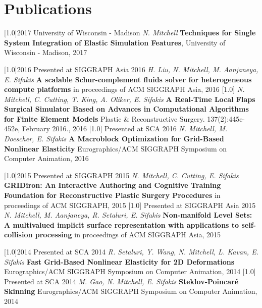 \documentclass{cv-style}     %
\begin{document}
\section{Publications}
  \vspace{-0.2cm}
\begin{entrylist}
\entry
{\scalebox{.8}[1.0]{2017}}
{}
{University of Wisconsin - Madison}
{\textit{N. Mitchell} \textbf{Techniques for
    Single System Integration of Elastic
    Simulation Features}, University of Wisconsin
  - Madison, 2017}
\end{entrylist}
\begin{entrylist}
\entry
{\scalebox{.8}[1.0]{2016}}
{}
{Presented at SIGGRAPH Asia 2016}
{\textit{H. Liu, N. Mitchell, M. Aanjaneya, E. Sifakis} \textbf{A
scalable Schur-complement fluids solver for
heterogeneous compute platforms}  in proceedings of
ACM SIGGRAPH Asia, 2016}
\entry
{\scalebox{.8}[1.0]{}}
{}
{}
{\textit{N. Mitchell, C. Cutting, T. King, A. Oliker,
E. Sifakis}  \textbf{A Real-Time Local Flaps Surgical
Simulator Based on Advances in Computational
Algorithms for Finite Element Models}  Plastic \&
Reconstructive Surgery. 137(2):445e-452e, February
2016., 2016}
\entry
{\scalebox{.8}[1.0]{}}
{}
{Presented at SCA 2016}
{\textit{N. Mitchell, M. Doescher, E. Sifakis}  \textbf{A Macroblock
Optimization for Grid-Based Nonlinear Elasticity}
Eurographics/ACM SIGGRAPH Symposium on Computer
Animation, 2016}
\end{entrylist}
\begin{entrylist}
\entry
{\scalebox{.8}[1.0]{2015}}
{}
{Presented at SIGGRAPH 2015}
{\textit{N. Mitchell, C. Cutting, E. Sifakis}  \textbf{GRIDiron: An
Interactive Authoring and Cognitive Training
Foundation for Reconstructive Plastic Surgery
Procedures}  in proceedings of ACM SIGGRAPH, 2015}
\entry
{\scalebox{.8}[1.0]{}}
{}
{Presented at SIGGRAPH Asia 2015}
{\textit{N. Mitchell, M. Aanjaneya, R. Setaluri, E. Sifakis}
\textbf{Non-manifold Level Sets: A multivalued implicit
surface representation with applications to
self-collision processing}  in proceedings of ACM
SIGGRAPH Asia, 2015}
\end{entrylist}
\begin{entrylist}
\entry
{\scalebox{.8}[1.0]{2014}}
{}
{Presented at SCA 2014}
{\textit{R. Setaluri, Y. Wang, N. Mitchell, L. Kavan,
E. Sifakis}  \textbf{Fast Grid-Based Nonlinear Elasticity
for 2D Deformations}  Eurographics/ACM SIGGRAPH
Symposium on Computer Animation, 2014}
\entry
{\scalebox{.8}[1.0]{}}
{}
{Presented at SCA 2014}
{\textit{M. Gao, N. Mitchell, E. Sifakis}  \textbf{Steklov-Poincar\'{e}
Skinning}  Eurographics/ACM SIGGRAPH Symposium on
Computer Animation, 2014}
\end{entrylist}
\end{document}
